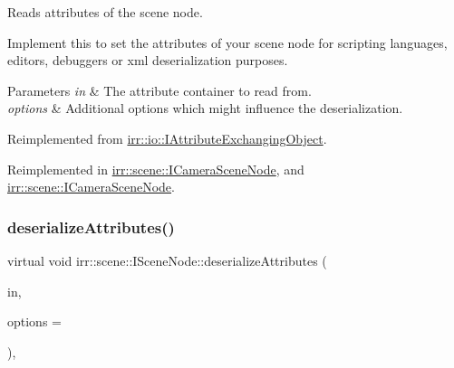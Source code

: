 Reads attributes of the scene node. 

Implement this to set the attributes of your scene node for scripting languages, editors, debuggers or xml deserialization purposes. 
\begin{DoxyParams}{Parameters}
{\em in} & The attribute container to read from. \\
\hline
{\em options} & Additional options which might influence the deserialization. \\
\hline
\end{DoxyParams}


Reimplemented from \hyperlink{classirr_1_1io_1_1IAttributeExchangingObject_a013d4ead3736d7fab4bc18c2d61a3e2e}{irr\+::io\+::\+I\+Attribute\+Exchanging\+Object}.



Reimplemented in \hyperlink{classirr_1_1scene_1_1ICameraSceneNode_a0df881cb5e2a55562399281061151ae8}{irr\+::scene\+::\+I\+Camera\+Scene\+Node}, and \hyperlink{classirr_1_1scene_1_1ICameraSceneNode_a0df881cb5e2a55562399281061151ae8}{irr\+::scene\+::\+I\+Camera\+Scene\+Node}.

\mbox{\label{classirr_1_1scene_1_1ISceneNode_a5fb609b08fc89a92f928c19ce3b181eb}} 
\subsubsection{\texorpdfstring{deserialize\+Attributes()}{deserializeAttributes()}\hspace{0.1cm}{\footnotesize\ttfamily [2/2]}}
{\footnotesize\ttfamily virtual void irr\+::scene\+::\+I\+Scene\+Node\+::deserialize\+Attributes (\begin{DoxyParamCaption}\item[{\hyperlink{classirr_1_1io_1_1IAttributes}{io\+::\+I\+Attributes} $\ast$}]{in,  }\item[{\hyperlink{structirr_1_1io_1_1SAttributeReadWriteOptions}{io\+::\+S\+Attribute\+Read\+Write\+Options} $\ast$}]{options = {} }\end{DoxyParamCaption})\hspace{0.3cm}{\ttfamily [inline]}, {\ttfamily [virtual]}}




